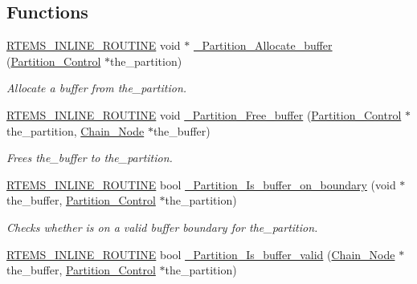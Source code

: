\subsection*{Functions}
\begin{DoxyCompactItemize}
\item 
\mbox{\hyperlink{group__RTEMSScoreBaseDefs_gac216239df231d5dbd15e3520b0b9313f}{R\+T\+E\+M\+S\+\_\+\+I\+N\+L\+I\+N\+E\+\_\+\+R\+O\+U\+T\+I\+NE}} void $\ast$ \mbox{\hyperlink{group__ClassicPartImpl_ga71de1566df69f6963e4e51098c1c4e23}{\+\_\+\+Partition\+\_\+\+Allocate\+\_\+buffer}} (\mbox{\hyperlink{structPartition__Control}{Partition\+\_\+\+Control}} $\ast$the\+\_\+partition)
\begin{DoxyCompactList}\small\item\em Allocate a buffer from the\+\_\+partition. \end{DoxyCompactList}\item 
\mbox{\hyperlink{group__RTEMSScoreBaseDefs_gac216239df231d5dbd15e3520b0b9313f}{R\+T\+E\+M\+S\+\_\+\+I\+N\+L\+I\+N\+E\+\_\+\+R\+O\+U\+T\+I\+NE}} void \mbox{\hyperlink{group__ClassicPartImpl_gad98ad79ca7f14ebf7fb884590494964c}{\+\_\+\+Partition\+\_\+\+Free\+\_\+buffer}} (\mbox{\hyperlink{structPartition__Control}{Partition\+\_\+\+Control}} $\ast$the\+\_\+partition, \mbox{\hyperlink{group__RTEMSScoreChain_ga0dd4bfcca1ac7f90de2842e447846d3d}{Chain\+\_\+\+Node}} $\ast$the\+\_\+buffer)
\begin{DoxyCompactList}\small\item\em Frees the\+\_\+buffer to the\+\_\+partition. \end{DoxyCompactList}\item 
\mbox{\hyperlink{group__RTEMSScoreBaseDefs_gac216239df231d5dbd15e3520b0b9313f}{R\+T\+E\+M\+S\+\_\+\+I\+N\+L\+I\+N\+E\+\_\+\+R\+O\+U\+T\+I\+NE}} bool \mbox{\hyperlink{group__ClassicPartImpl_gadbd0a0a18e9149e5d8ccf75221fbf2d5}{\+\_\+\+Partition\+\_\+\+Is\+\_\+buffer\+\_\+on\+\_\+boundary}} (void $\ast$the\+\_\+buffer, \mbox{\hyperlink{structPartition__Control}{Partition\+\_\+\+Control}} $\ast$the\+\_\+partition)
\begin{DoxyCompactList}\small\item\em Checks whether is on a valid buffer boundary for the\+\_\+partition. \end{DoxyCompactList}\item 
\mbox{\hyperlink{group__RTEMSScoreBaseDefs_gac216239df231d5dbd15e3520b0b9313f}{R\+T\+E\+M\+S\+\_\+\+I\+N\+L\+I\+N\+E\+\_\+\+R\+O\+U\+T\+I\+NE}} bool \mbox{\hyperlink{group__ClassicPartImpl_ga9fc3a1c2d40c73f16df3fd6a6be9c43f}{\+\_\+\+Partition\+\_\+\+Is\+\_\+buffer\+\_\+valid}} (\mbox{\hyperlink{group__RTEMSScoreChain_ga0dd4bfcca1ac7f90de2842e447846d3d}{Chain\+\_\+\+Node}} $\ast$the\+\_\+buffer, \mbox{\hyperlink{structPartition__Control}{Partition\+\_\+\+Control}} $\ast$the\+\_\+partition)

\end{DoxyCompactItemize}

